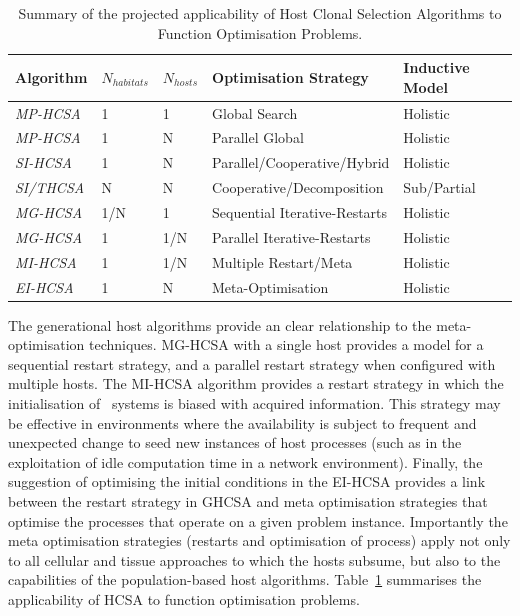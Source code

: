 \begin{table}[htp]
	\centering\small
		\begin{tabular}{lllll}
		\toprule
		\textbf{Algorithm} & \textbf{$N_{habitats}$} & \textbf{$N_{hosts}$} & \textbf{Optimisation Strategy} & \textbf{Inductive Model} \\ 
		\toprule
		\emph{MP-HCSA} & 1   & 1   & Global Search & Holistic \\ 
		\emph{MP-HCSA} & 1   & N   & Parallel Global & Holistic \\ 
		\emph{SI-HCSA} & 1   & N   & Parallel/Cooperative/Hybrid & Holistic \\ 		
		\emph{SI/THCSA}& N   & N   & Cooperative/Decomposition & Sub/Partial \\
		\emph{MG-HCSA} & 1/N & 1 & Sequential Iterative-Restarts & Holistic \\ 
		\emph{MG-HCSA} & 1 & 1/N & Parallel Iterative-Restarts & Holistic \\ 
		\emph{MI-HCSA} & 1 & 1/N & Multiple Restart/Meta & Holistic \\ 
		\emph{EI-HCSA} & 1 & N   & Meta-Optimisation & Holistic \\ 		
		\bottomrule
		\end{tabular}
	\caption{Summary of the projected applicability of Host Clonal Selection Algorithms to Function Optimisation Problems.}
	\label{tab:iidle:function:optimisation:hosts}
\end{table}

The generational host algorithms provide an clear relationship to the meta-optimisation techniques. MG-HCSA with a single host provides a model for a sequential restart strategy, and a parallel restart strategy when configured with multiple hosts. 
The MI-HCSA algorithm provides a restart strategy in which the initialisation of \naive\ systems is biased with acquired information. This strategy may be effective in environments where the availability is subject to frequent and unexpected change to seed new instances of host processes (such as in the exploitation of idle computation time in a network environment).
Finally, the suggestion of optimising the initial conditions in the EI-HCSA provides a link between the restart strategy in GHCSA and meta optimisation strategies that optimise the processes that operate on a given problem instance.
Importantly the meta optimisation strategies (restarts and optimisation of process) apply not only to all cellular and tissue approaches to which the hosts subsume, but also to the capabilities of the population-based host algorithms. 
Table~\ref{tab:iidle:function:optimisation:hosts} summarises the applicability of HCSA to function optimisation problems.

